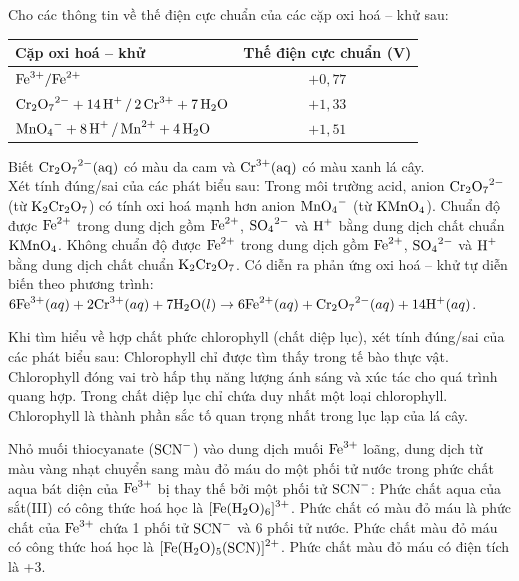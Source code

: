 \documentclass[11pt,a4paper]{article}
\def\loigiai#1{}
\begin{document}
\begin{ex}
[CĐ – SBT] Cho các thông tin về thế điện cực chuẩn của các cặp oxi hoá – khử sau:
\begin{center}
\renewcommand{\arraystretch}{1.1}
\begin{tabular}{|l|c|}
\hline
\textbf{Cặp oxi hoá -- khử} & \textbf{Thế điện cực chuẩn (V)} \\
\hline
$\ce{Fe^3+/Fe^2+}$ & $+0,77$ \\
\hline
$\ce{Cr2O7^2- + 14H+ / 2Cr^3+ + 7H2O}$ & $+1,33$ \\
\hline
$\ce{MnO4- + 8H+ / Mn^2+ + 4H2O}$ & $+1,51$ \\
\hline
\end{tabular}
\end{center}
Biết $\ce{Cr2O7^2-(aq)}$ có màu da cam và $\ce{Cr^3+(aq)}$ có màu xanh lá cây.\\
Xét tính đúng/sai của các phát biểu sau:
\choiceTF
{Trong môi trường acid, anion $\ce{Cr2O7^2-}$ (từ $\ce{K2Cr2O7}$) có tính oxi hoá mạnh hơn anion $\ce{MnO4-}$ (từ $\ce{KMnO4}$).}
{Chuẩn độ được $\ce{Fe^2+}$ trong dung dịch gồm $\ce{Fe^2+}$, $\ce{SO4^2-}$ và $\ce{H+}$ bằng dung dịch chất chuẩn $\ce{KMnO4}$.}
{Không chuẩn độ được $\ce{Fe^2+}$ trong dung dịch gồm $\ce{Fe^2+}$, $\ce{SO4^2-}$ và $\ce{H+}$ bằng dung dịch chất chuẩn $\ce{K2Cr2O7}$.}
{Có diễn ra phản ứng oxi hoá – khử tự diễn biến theo phương trình:\\ $6\ce{Fe^3+}(aq) + 2\ce{Cr^3+}(aq) + 7\ce{H2O}(l) \rightarrow 6\ce{Fe^2+}(aq) + \ce{Cr2O7^2-}(aq) + 14\ce{H+}(aq)$.}
\loigiai{}
\end{ex}

\begin{ex}
 Khi tìm hiểu về hợp chất phức chlorophyll (chất diệp lục), xét tính đúng/sai của các phát biểu sau:
\choiceTF
{Chlorophyll chỉ được tìm thấy trong tế bào thực vật.}
{Chlorophyll đóng vai trò hấp thụ năng lượng ánh sáng và xúc tác cho quá trình quang hợp.}
{Trong chất diệp lục chỉ chứa duy nhất một loại chlorophyll.}
{Chlorophyll là thành phần sắc tố quan trọng nhất trong lục lạp của lá cây.}
\loigiai{}
\end{ex}

\begin{ex}
 Nhỏ muối thiocyanate ($\ce{SCN-}$) vào dung dịch muối $\ce{Fe^3+}$ loãng, dung dịch từ màu vàng nhạt chuyển sang màu đỏ máu do một phối tử nước trong phức chất aqua bát diện của $\ce{Fe^3+}$ bị thay thế bởi một phối tử $\ce{SCN-}$:
\choiceTF
{Phức chất aqua của sắt(III) có công thức hoá học là $\ce{[Fe(H2O)6]^3+}$.}
{Phức chất có màu đỏ máu là phức chất của $\ce{Fe^3+}$ chứa 1 phối tử $\ce{SCN-}$ và 6 phối tử nước.}
{Phức chất màu đỏ máu có công thức hoá học là $\ce{[Fe(H2O)5(SCN)]^2+}$.}
{Phức chất màu đỏ máu có điện tích là +3.}
\loigiai{}
\end{ex}
\end{document}
